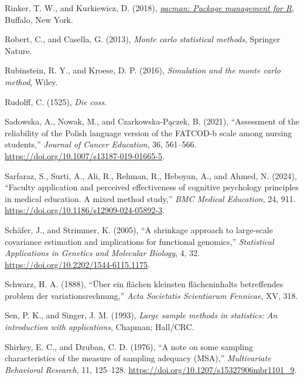 \documentclass[
  10pt,
  a4paper,
  twoside]{article}
\newlength{\cslhangindent}
\newenvironment{CSLReferences}[2] %
 {\begin{list}{}{%
  \setlength{\itemindent}{0pt}
  \setlength{\leftmargin}{0pt}
  \setlength{\parsep}{0pt}
  \ifodd #1
   \setlength{\leftmargin}{\cslhangindent}
   \setlength{\itemindent}{-1\cslhangindent}
  \fi
  \setlength{\itemsep}{#2\baselineskip}}}
 {\end{list}}
\begin{document}
\begin{CSLReferences}{1}{0}
Rinker, T. W., and Kurkiewicz, D. (2018), \emph{\href{http://github.com/trinker/pacman}{{pacman}: {P}ackage management for {R}}}, Buffalo, New York.

Robert, C., and Casella, G. (2013), \emph{Monte carlo statistical methods}, Springer Nature.

Rubinstein, R. Y., and Kroese, D. P. (2016), \emph{Simulation and the monte carlo method}, Wiley.

Rudolff, C. (1525), \emph{Die coss}.

Sadowska, A., Nowak, M., and Czarkowska-Pączek, B. (2021), {``Assessment of the reliability of the {Polish} language version of the FATCOD-b scale among nursing students,''} \emph{Journal of Cancer Education}, 36, 561--566. \url{https://doi.org/10.1007/s13187-019-01665-5}.

Sarfaraz, S., Surti, A., Ali, R., Rehman, R., Heboyan, A., and Ahmed, N. (2024), {``Faculty application and perceived effectiveness of cognitive psychology principles in medical education. A mixed method study,''} \emph{BMC Medical Education}, 24, 911. \url{https://doi.org/10.1186/s12909-024-05892-3}.

Schäfer, J., and Strimmer, K. (2005), {``A shrinkage approach to large-scale covariance estimation and implications for functional genomics,''} \emph{Statistical Applications in Genetics and Molecular Biology}, 4, 32. \url{https://doi.org/10.2202/1544-6115.1175}.

Schwarz, H. A. (1888), {``Über ein flächen kleinsten flächeninhalts betreffendes problem der variationsrechnung,''} \emph{Acta Societatis Scientiarum Fennicae}, XV, 318.

Sen, P. K., and Singer, J. M. (1993), \emph{Large sample methods in statistics: An introduction with applications}, Chapman; Hall/CRC.

Shirkey, E. C., and Dzuban, C. D. (1976), {``A note on some sampling characteristics of the measure of sampling adequacy (MSA),''} \emph{Multivariate Behavioral Research}, 11, 125--128. \url{https://doi.org/10.1207/s15327906mbr1101_9}.


\end{CSLReferences}
\end{document}
